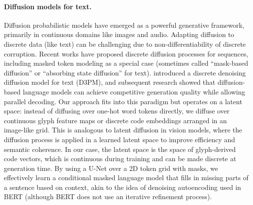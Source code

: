 \documentclass[10pt,twocolumn]{article}
\begin{document}
\paragraph{Diffusion models for text.} Diffusion probabilistic models \citep{austin2021d3pm} have emerged as a powerful generative framework, primarily in continuous domains like images and audio. Adapting diffusion to discrete data (like text) can be challenging due to non-differentiability of discrete corruption. Recent works have proposed discrete diffusion processes for sequences, including masked token modeling as a special case (sometimes called ``mask-based diffusion'' or ``absorbing state diffusion'' for text). \citep{austin2021d3pm} introduced a discrete denoising diffusion model for text (D3PM), and subsequent research showed that diffusion-based language models can achieve competitive generation quality while allowing parallel decoding. Our approach fits into this paradigm but operates on a latent space: instead of diffusing over one-hot word tokens directly, we diffuse over continuous glyph feature maps or discrete code embeddings arranged in an image-like grid. This is analogous to latent diffusion in vision models, where the diffusion process is applied in a learned latent space to improve efficiency and semantic coherence. In our case, the latent space is the space of glyph-derived code vectors, which is continuous during training and can be made discrete at generation time. By using a U-Net over a 2D token grid with masks, we effectively learn a conditional masked language model that fills in missing parts of a sentence based on context, akin to the idea of denoising autoencoding used in BERT (although BERT does not use an iterative refinement process).
\end{document}
